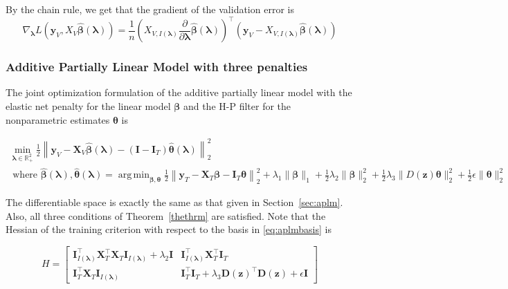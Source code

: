 \documentclass[10pt,letterpaper]{article}
\DeclareMathOperator*{\argmin}{arg\,min}
\begin{document}
By the chain rule, we get that the gradient of the validation error is
\begin{equation}
\nabla_{\boldsymbol \lambda} L(\boldsymbol y_V, X_V \hat {\boldsymbol \beta}(\boldsymbol \lambda)) =
\frac{1}{n}
\left (
X_{V, I(\boldsymbol \lambda)}
\frac{\partial}{\partial \boldsymbol \lambda}\hat {\boldsymbol \beta}(\boldsymbol \lambda)
\right )^\top
(\boldsymbol y_V - X_{V, I(\boldsymbol \lambda)} \hat {\boldsymbol \beta}(\boldsymbol \lambda) )
\end{equation}

\subsubsection{Additive Partially Linear Model with three penalties}

The joint optimization formulation of the additive partially linear model with the elastic net penalty for the linear model $\boldsymbol \beta$ and the H-P filter for the nonparametric estimates $\boldsymbol \theta$ is

\begin{equation}
\begin{array}{c}
\min_{\boldsymbol\lambda \in \mathbb{R}^2_{+}} \frac{1}{2}
\left \|
\boldsymbol{y}_V
- \boldsymbol{X}_V\hat{\boldsymbol{\beta}}(\boldsymbol{\lambda})
- (\boldsymbol{I} - \boldsymbol{I}_T) \hat{\boldsymbol{\theta}}(\boldsymbol{\lambda})
\right \|^2_2 \\
\text{ where }
\hat{\boldsymbol{\beta}}(\boldsymbol{\lambda}),
\hat{\boldsymbol{\theta}}(\boldsymbol{\lambda}) =
\argmin_{\boldsymbol{\beta}, \boldsymbol{\theta}}
\frac{1}{2} \left \|
\boldsymbol{y}_T
- \boldsymbol{X}_T\boldsymbol{\beta}
- \boldsymbol{I}_T \boldsymbol{\theta} \right \|^2_2
+ \lambda_1 \| \boldsymbol \beta \|_1
+ \frac{1}{2} \lambda_2 \| \boldsymbol \beta \|_2^2
+ \frac{1}{2} \lambda_3 \| D(\boldsymbol z) \boldsymbol \theta \|_2^2
+ \frac{1}{2} \epsilon \| \boldsymbol{\theta} \|_2^2
\end{array}
\label{eq:aplm3JointOpt}
\end{equation}

The differentiable space is exactly the same as that given in Section~\ref{sec:aplm}. Also, all three conditions of Theorem~\ref{thethrm} are satisfied. Note that the Hessian of the training criterion with respect to the basis in \ref{eq:aplmbasis} is

\begin{equation}
H =
\begin{bmatrix}
\boldsymbol I_{I(\boldsymbol \lambda)}^\top \boldsymbol X_T^\top \boldsymbol X_T \boldsymbol I_{I(\boldsymbol \lambda)} + \lambda_2 \boldsymbol I
&  \boldsymbol I_{I(\boldsymbol \lambda)}^\top \boldsymbol X_T^\top \boldsymbol I_T \\
\boldsymbol I_T^\top \boldsymbol X_T \boldsymbol I_{I(\boldsymbol \lambda)} &
\boldsymbol I_T^\top \boldsymbol{I}_T + \lambda_3 \boldsymbol{D}(\boldsymbol{z})^\top \boldsymbol{D}(\boldsymbol{z}) + \epsilon \boldsymbol I
\end{bmatrix}
\end{equation}
\end{document}
